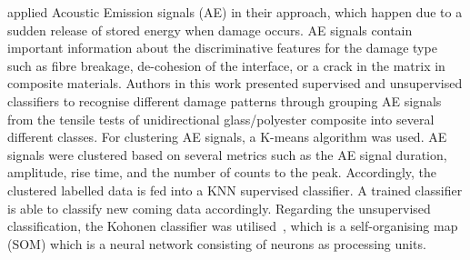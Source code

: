 \textcite{Godin2004} applied Acoustic Emission signals (AE) in their approach, which happen due to a sudden release of stored energy when damage occurs.
AE signals contain important information about the discriminative features 
for the damage type such as fibre breakage, de-cohesion of the interface, or a crack in the matrix in composite materials.
Authors in this work presented supervised and unsupervised classifiers to recognise different damage patterns through grouping AE signals from the tensile tests of unidirectional glass/polyester composite into several different classes. 
For clustering AE signals, a K-means algorithm was used. 
AE signals were clustered based on several metrics such as the AE signal duration, amplitude, rise time, and the number of counts to the peak.
Accordingly, the clustered labelled data is fed into a KNN supervised classifier.
A trained classifier is able to classify new coming data accordingly.
Regarding the unsupervised classification, the Kohonen classifier was utilised~\cite{58325}, which is a self-organising map (SOM) which is a neural network consisting of neurons as processing units. 

